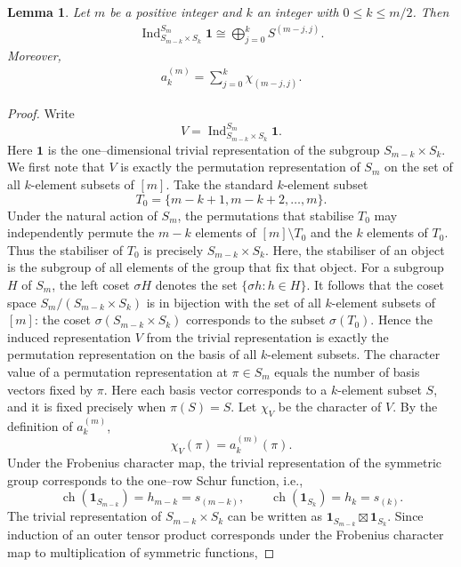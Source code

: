 \documentclass[11pt,a4paper]{article}
\newtheorem{lemma}[theorem]{Lemma}
\begin{document}
\begin{lemma}\label{lem2.1}
Let $m$ be a positive integer and $k$ an integer with $0\leq k\leq m/2$. Then
\begin{eqnarray*}
  \operatorname{Ind}_{S_{m-k}\times S_k}^{S_m}\mathbf{1}
  \cong\bigoplus_{j=0}^{k}S^{(m-j,j)}.
\end{eqnarray*}
Moreover,
\begin{eqnarray*}
  a_k^{(m)}=\sum_{j=0}^{k}\chi_{(m-j,j)}.
\end{eqnarray*}
\end{lemma}

\begin{proof}
Write
\[
  V=\operatorname{Ind}_{S_{m-k}\times S_k}^{S_m}\mathbf{1}.
\]
Here $\mathbf{1}$ is the one–dimensional trivial representation of the subgroup $S_{m-k}\times S_k$. We first note that $V$ is exactly the permutation representation of $S_m$ on the set of all $k$-element subsets of $[m]$.
Take the standard $k$-element subset
\[
  T_0=\{m-k+1,m-k+2,\ldots,m\}.
\]
Under the natural action of $S_m$, the permutations that stabilise $T_0$ may independently permute the $m-k$ elements of $[m]\setminus T_0$ and the $k$ elements of $T_0$.
Thus the stabiliser of $T_0$ is precisely $S_{m-k}\times S_k$. Here, the stabiliser of an object is the subgroup of all elements of the group that fix that object. For a subgroup $H$ of $S_m$, the left coset $\sigma H$ denotes the set $\{\sigma h:h\in H\}$. It follows that the coset space $S_m/(S_{m-k}\times S_k)$ is in bijection with the set of all $k$-element subsets of $[m]$: the coset $\sigma(S_{m-k}\times S_k)$ corresponds to the subset $\sigma(T_0)$. Hence the induced representation $V$ from the trivial representation is exactly the permutation representation on the basis of all $k$-element subsets. The character value of a permutation representation at $\pi\in S_m$ equals the number of basis vectors fixed by $\pi$. Here each basis vector corresponds to a $k$-element subset $S$, and it is fixed precisely when $\pi(S)=S$. Let $\chi_V$ be the character of $V$. By the definition of $a_k^{(m)}$,
\[
  \chi_V(\pi)=a_k^{(m)}(\pi).
\]
Under the Frobenius character map, the trivial representation of the symmetric group corresponds to the one–row Schur function, i.e.,
\[
  \operatorname{ch}(\mathbf{1}_{S_{m-k}})=h_{m-k}=s_{(m-k)},
  \qquad
  \operatorname{ch}(\mathbf{1}_{S_k})=h_k=s_{(k)}.
\]
The trivial representation of $S_{m-k}\times S_k$ can be written as $\mathbf{1}_{S_{m-k}}\boxtimes\mathbf{1}_{S_k}$. Since induction of an outer tensor product corresponds under the Frobenius character map to multiplication of symmetric functions,

\end{proof}
\end{document}
